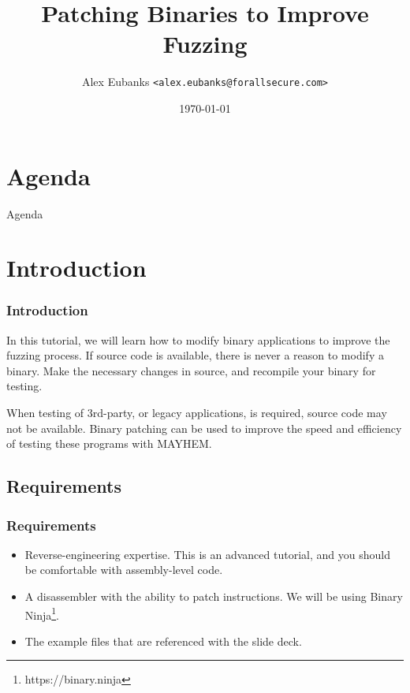 \documentclass{beamer}
\title{Patching Binaries to Improve Fuzzing}
\date{\today}
\author[Eubanks]{Alex Eubanks \texttt{<alex.eubanks@forallsecure.com>}}
\begin{document}
\begin{frame}
\titlepage
\end{frame}

\section{Agenda}

\begin{frame}{Agenda}
\setlength{\parskip}{0cm}
\tableofcontents
\end{frame}

\section{Introduction}

\begin{frame}
\frametitle{Introduction}
In this tutorial, we will learn how to modify binary applications to improve the
fuzzing process. If source code is available, there is never a reason to modify
a binary. Make the necessary changes in source, and recompile your binary for
testing.\par
When testing of 3rd-party, or legacy applications, is required, source code may
not be available. Binary patching can be used to improve the speed and
efficiency of testing these programs with MAYHEM.
\end{frame}

\subsection{Requirements}

\begin{frame}
\frametitle{Requirements}
\begin{itemize}
  \item Reverse-engineering expertise. This is an advanced tutorial, and you
    should be comfortable with assembly-level code.
  \item A disassembler with the ability to patch instructions. We will be using
    Binary Ninja\footnote{https://binary.ninja}.
  \item The example files that are referenced with the slide deck.
\end{itemize}
\end{frame}
\end{document}
